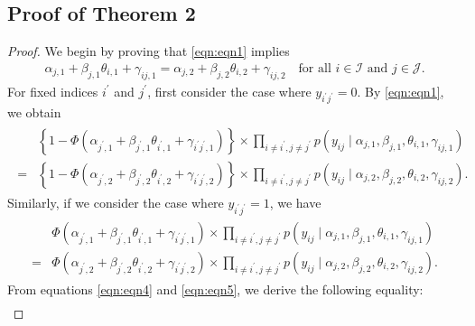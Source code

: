 \documentclass[11pt]{article}
\begin{document}
\subsection{Proof of Theorem 2}\label{Appen_A.2}
\begin{proof}
     We begin by proving that \eqref{eqn:eqn1} implies  
    \begin{align}\label{eqn:eqn3}  
    \alpha_{j,1} + \beta_{j,1} \theta_{i,1} + \gamma_{ij,1} = \alpha_{j,2} + \beta_{j,2} \theta_{i,2} + \gamma_{ij,2} \quad \text{for all } i \in \mathcal{I} \text{ and } j \in \mathcal{J}.  
    \end{align}  
    For fixed indices $ i^\prime $ and $ j^\prime $, first consider the case where $ y_{i^\prime j^\prime} = 0 $. By \eqref{eqn:eqn1}, we obtain  
    \begin{align}\label{eqn:eqn4}  
    \begin{split}  
    &\left\{1-\Phi(\alpha_{j^\prime, 1} + \beta_{j^\prime, 1} \theta_{i^\prime, 1} + \gamma_{i^\prime j^\prime, 1})\right\} \times \prod_{i \neq i^\prime, j \neq j^\prime} p(y_{ij} \mid \alpha_{j,1}, \beta_{j,1}, \theta_{i,1}, \gamma_{ij, 1}) \\  
    = &\left\{1-\Phi(\alpha_{j^\prime, 2} + \beta_{j^\prime, 2} \theta_{i^\prime, 2} + \gamma_{i^\prime j^\prime, 2})\right\} \times \prod_{i \neq i^\prime, j \neq j^\prime} p(y_{ij} \mid \alpha_{j,2}, \beta_{j,2}, \theta_{i,2}, \gamma_{ij,2}).  
    \end{split}  
    \end{align}  
    Similarly, if we consider the case where $ y_{i^\prime j^\prime} = 1 $, we have  
    \begin{align}\label{eqn:eqn5}  
    \begin{split}  
    &\Phi(\alpha_{j^\prime, 1} + \beta_{j^\prime, 1} \theta_{i^\prime, 1} + \gamma_{i^\prime j^\prime, 1}) \times \prod_{i \neq i^\prime, j \neq j^\prime} p(y_{ij} \mid \alpha_{j,1}, \beta_{j,1}, \theta_{i,1}, \gamma_{ij, 1}) \\  
    = &\Phi(\alpha_{j^\prime, 2} + \beta_{j^\prime, 2} \theta_{i^\prime, 2} + \gamma_{i^\prime j^\prime, 2}) \times \prod_{i \neq i^\prime, j \neq j^\prime} p(y_{ij} \mid \alpha_{j,2}, \beta_{j,2}, \theta_{i,2}, \gamma_{ij,2}). 
    \end{split}  
    \end{align}  
    From equations \eqref{eqn:eqn4} and \eqref{eqn:eqn5}, we derive the following equality:  
    \begin{align*}  

\end{align*}
\end{proof}
\end{document}
